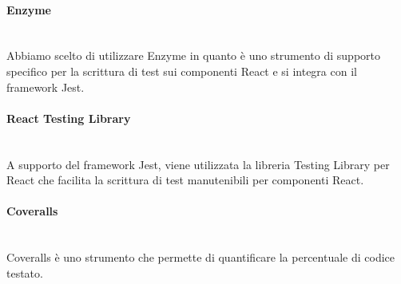	\paragraph{Enzyme}\mbox{}\\ [1mm]
	Abbiamo scelto di utilizzare Enzyme in quanto è uno strumento di supporto specifico per la scrittura di test sui componenti React e si integra con il framework Jest.
	\paragraph{React Testing Library}\mbox{}\\ [1mm]
	A supporto del framework Jest, viene utilizzata la libreria Testing Library per React che facilita la scrittura di test manutenibili per componenti React.
	\paragraph{Coveralls}\mbox{}\\ [1mm]
	Coveralls è uno strumento che permette di quantificare la percentuale di codice testato.
